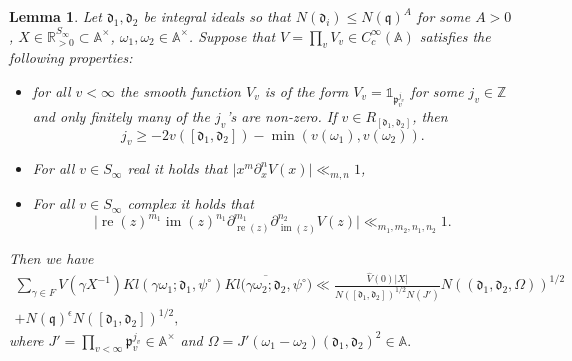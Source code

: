 \documentclass[a4paper,11pt]{amsart}
\newtheorem{lemma}[theorem]{Lemma}
\theoremstyle{definition}
\newcommand{\A}{\mathbb{A}}
\newcommand{\R}{\mathbb{R}}
\newcommand{\Z}{\mathbb{Z}}
\newcommand{\imag}{\operatorname{im}}
\newcommand{\real}{\operatorname{re}}
\begin{document}
    \begin{lemma}\label{lem:4.3}Let $\mathfrak{d}_1,\mathfrak{d}_2$ be integral ideals so that $N(\mathfrak{d}_i)\leq N(\mathfrak{q})^A$ for some $A>0$, $X \in \R_{>0}^{S_{\infty}} \subset \A^{\times}$, $\omega_1,\omega_2 \in \A^{\times}$.
    Suppose that $V = \prod_{v}V_v \in C_c^{\infty}(\A)$ satisfies the following properties:\begin{itemize}
        \item for all $v<\infty$ the smooth function $V_v$ is of the form $V_v=\mathbb{1}_{\mathfrak{p}_v^{j_v}}$ for some $j_v \in \Z$ and only finitely many of the $j_v$'s are non-zero. If $v\in R_{[\mathfrak{d}_1,\mathfrak{d}_2]}$, then $$j_v\geq -2v([\mathfrak{d}_1,\mathfrak{d}_2])-\min(v(\omega_1),v(\omega_2)).$$
       
        \item For all $v\in S_{\infty}$ real it holds that $\vert{x^m\partial^n_xV(x)}\vert \ll_{m,n} 1$,
        \item For all $v\in S_{\infty}$ complex it holds that 
        $$\vert{\real(z)^{m_1}\imag(z)^{n_1} \partial_{\real(z)}^{m_1}\partial_{\imag(z)}^{n_2}V(z)}\vert \ll_{m_1,m_2,n_1,n_2} 1. $$
        \end{itemize}
        Then we have \begin{align*} \sum_{\gamma \in F}V(\gamma X^{-1})Kl(\gamma \omega_1;\mathfrak{d}_1,\psi^{\circ})\overline{Kl(\gamma\omega_2;\mathfrak{d}_2,\psi^{\circ}}) \ll \frac{\widehat{V}(0)\vert{X}\vert  }{N([\mathfrak{d}_1,\mathfrak{d}_2])^{1/2}N(J')} N\left((\mathfrak{d}_1,\mathfrak{d}_2,\Omega) \right)^{1/2} \\+   N(\mathfrak{q})^{\epsilon}N([\mathfrak{d}_1,\mathfrak{d}_2])^{1/2}, \end{align*}
        where $J' = \prod_{v<\infty}\mathfrak{p}_v^{j_v}\in \A^{\times}$ and $\Omega=J'(\omega_1-\omega_2)(\mathfrak{d}_1,\mathfrak{d}_2)^2 \in \A.$\end{lemma}
\end{document}
